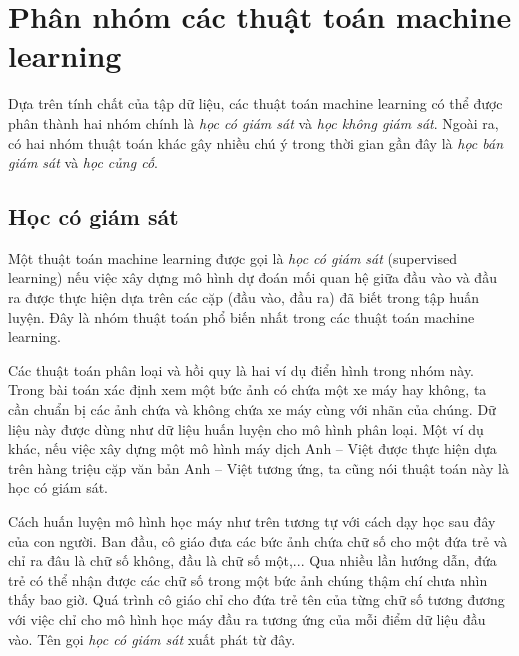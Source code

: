 
\section{Phân nhóm các thuật toán machine learning}
Dựa trên tính chất của tập dữ liệu, các thuật toán machine learning có thể
được phân thành hai nhóm chính là \textit{học có giám sát} và \textit{học không giám sát}. Ngoài ra, có hai nhóm thuật toán khác gây nhiều chú ý trong thời gian gần đây là \textit{học bán giám sát} và \textit{học củng cố}.

\subsection{Học có giám sát}
Một thuật toán machine learning được gọi là \textit{học có giám sát} (supervised learning) nếu việc xây dựng mô hình dự đoán mối quan hệ giữa đầu vào và đầu ra được thực hiện dựa trên các cặp (đầu vào, đầu ra) đã biết trong tập huấn luyện. Đây là nhóm thuật toán phổ biến nhất trong các thuật toán machine learning.

Các thuật toán phân loại và hồi quy là hai ví dụ điển hình trong nhóm này. Trong bài toán xác định xem một bức ảnh có chứa một xe máy hay không, ta cần chuẩn bị các ảnh chứa và không chứa xe máy cùng với nhãn của chúng. Dữ liệu này được dùng như dữ liệu huấn luyện cho mô hình phân loại. Một ví dụ khác, nếu việc xây dựng một mô hình máy dịch Anh -- Việt được thực hiện dựa trên hàng triệu cặp văn bản Anh -- Việt tương ứng, ta cũng nói thuật toán này là học có giám sát.

Cách huấn luyện mô hình học máy như trên tương tự với cách dạy học sau đây của
con người. Ban đầu, cô giáo đưa các bức ảnh chứa chữ số cho một đứa trẻ và chỉ
ra đâu là chữ số không, đầu là chữ số một,... Qua nhiều lần hướng dẫn, đứa trẻ
có thể nhận được các chữ số trong một bức ảnh chúng thậm chí chưa nhìn thấy bao
giờ. Quá trình cô giáo chỉ cho đứa trẻ tên của từng chữ số tương đương với việc
chỉ cho mô hình học máy đầu ra tương ứng của mỗi điểm dữ liệu đầu vào. Tên gọi
\textit{học có giám sát} xuất phát từ đây.


